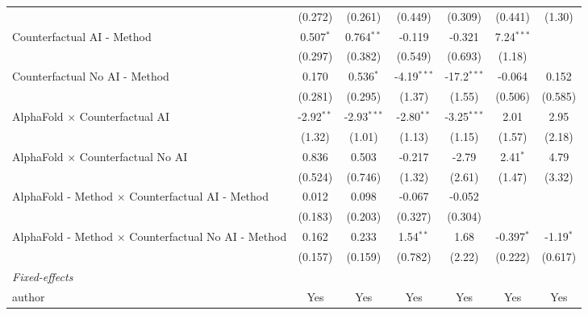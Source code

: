 \begin{tabular}{lcccccc}
                                                              & (0.272)      & (0.261)       & (0.449)       & (0.309)       & (0.441)      & (1.30)\\   
   Counterfactual AI - Method                                 & 0.507$^{*}$  & 0.764$^{**}$  & -0.119        & -0.321        & 7.24$^{***}$ &   \\   
                                                              & (0.297)      & (0.382)       & (0.549)       & (0.693)       & (1.18)       &   \\   
   Counterfactual No AI - Method                              & 0.170        & 0.536$^{*}$   & -4.19$^{***}$ & -17.2$^{***}$ & -0.064       & 0.152\\   
                                                              & (0.281)      & (0.295)       & (1.37)        & (1.55)        & (0.506)      & (0.585)\\   
   AlphaFold $\times$ Counterfactual AI                       & -2.92$^{**}$ & -2.93$^{***}$ & -2.80$^{**}$  & -3.25$^{***}$ & 2.01         & 2.95\\   
                                                              & (1.32)       & (1.01)        & (1.13)        & (1.15)        & (1.57)       & (2.18)\\   
   AlphaFold $\times$ Counterfactual No AI                    & 0.836        & 0.503         & -0.217        & -2.79         & 2.41$^{*}$   & 4.79\\   
                                                              & (0.524)      & (0.746)       & (1.32)        & (2.61)        & (1.47)       & (3.32)\\   
   AlphaFold - Method $\times$ Counterfactual AI - Method     & 0.012        & 0.098         & -0.067        & -0.052        &              &   \\   
                                                              & (0.183)      & (0.203)       & (0.327)       & (0.304)       &              &   \\   
   AlphaFold - Method $\times$ Counterfactual No AI - Method  & 0.162        & 0.233         & 1.54$^{**}$   & 1.68          & -0.397$^{*}$ & -1.19$^{*}$\\   
                                                              & (0.157)      & (0.159)       & (0.782)       & (2.22)        & (0.222)      & (0.617)\\   
   \midrule
   \emph{Fixed-effects}\\
   author                                                     & Yes          & Yes           & Yes           & Yes           & Yes          & Yes\\  

\end{tabular}
